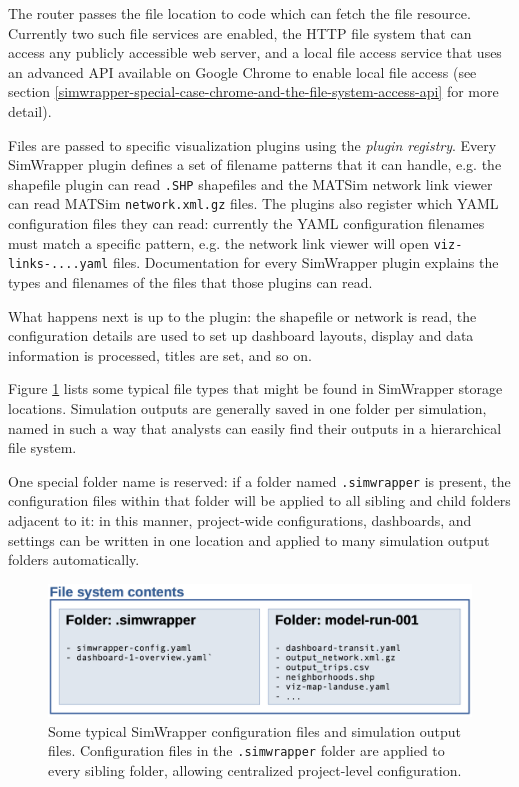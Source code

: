 The router passes the file location to code which can fetch the file resource. Currently two such file services are enabled, the HTTP file system that can access any publicly accessible web server, and a local file access service that uses an advanced API available on Google Chrome to enable local file access (see section \ref{simwrapper-special-case-chrome-and-the-file-system-access-api} for more detail).

Files are passed to specific visualization plugins using the \emph{plugin registry}. Every SimWrapper plugin defines a set of filename patterns that it can handle, e.g. the shapefile plugin can read \texttt{.SHP} shapefiles and the MATSim network link viewer can read MATSim \texttt{network.xml.gz} files. The plugins also register which YAML configuration files they can read: currently the YAML configuration filenames must match a specific pattern, e.g. the network link viewer will open \texttt{viz-links-....yaml} files. Documentation for every SimWrapper plugin explains the types and filenames of the files that those plugins can read.

What happens next is up to the plugin: the shapefile or network is read, the configuration details are used to set up dashboard layouts, display and data information is processed, titles are set, and so on.

Figure \ref{fig:simwrapper-flowchart-2} lists some typical file types that might be found in SimWrapper storage locations. Simulation outputs are generally saved in one folder per simulation, named in such a way that analysts can easily find their outputs in a hierarchical file system.

One special folder name is reserved: if a folder named \texttt{.simwrapper} is present, the configuration files within that folder will be applied to all sibling and child folders adjacent to it: in this manner, project-wide configurations, dashboards, and settings can be written in one location and applied to many simulation output folders automatically.

\begin{figure}[ht]
  \centering
  \includegraphics[width=0.95\linewidth]{chapters/31-simwrapper/images/flowchart-2.png}
  \caption{Some typical SimWrapper configuration files and simulation output files. Configuration files in the \texttt{.simwrapper} folder are applied to every sibling folder, allowing centralized project-level configuration.}
  \label{fig:simwrapper-flowchart-2}
\end{figure}

